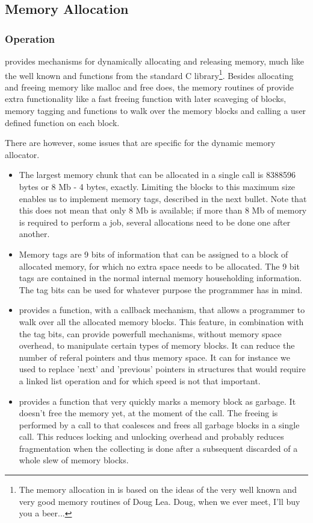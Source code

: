 %
%

\subsection{Memory Allocation}

\subsubsection{Operation}

\oswald provides mechanisms for dynamically allocating and releasing memory,
much like the well known  and  functions from
the standard C library\footnote{The memory allocation in \oswald is based on
the ideas of the very well known and very good memory routines of Doug Lea.
Doug, when we ever meet, I'll buy you a beer...}.
Besides allocating and freeing memory like malloc and free does, the memory
routines of \oswald provide extra functionality like a fast freeing function
with later scaveging of blocks, memory tagging and functions to walk over
the memory blocks and calling a user defined function on each block.

There are however, some issues that are specific for the \oswald dynamic
memory allocator.

\begin{itemize}
\item The largest memory chunk that can be allocated in a single call is
8388596 bytes or 8 Mb - 4 bytes, exactly. Limiting the blocks to this maximum size enables us
to implement memory tags, described in the next bullet. Note that this does
not mean that only 8 Mb is available; if more than 8 Mb of memory is
required to perform a job, several allocations need to be done one after
another. 
\item Memory tags are 9 bits of information that can be assigned to a block
of allocated memory, for which no extra space needs to be allocated. The 9
bit tags are contained in the normal internal memory householding
information. The tag bits can be used for whatever purpose the programmer
has in mind. 
\item \oswald provides a function, with a callback mechanism, that allows a
programmer to walk over all the allocated memory blocks. This feature, in
combination with the tag bits, can provide powerfull mechanisms, without
memory space overhead, to manipulate certain types of memory blocks. It can
reduce the number of referal pointers and thus memory space. It can for
instance we used to replace 'next' and 'previous' pointers in structures
that would require a linked list operation and for which speed is not that
important.
\item \oswald provides a  function that very quickly marks a
memory block as garbage. It doesn't free the memory yet, at the moment of
the call. The freeing is performed by a call to 
that coalesces and frees all garbage blocks in a single call. This reduces
locking and unlocking overhead and probably reduces fragmentation when the
collecting is done after a subsequent discarded of a whole slew of memory
blocks.
\end{itemize}

